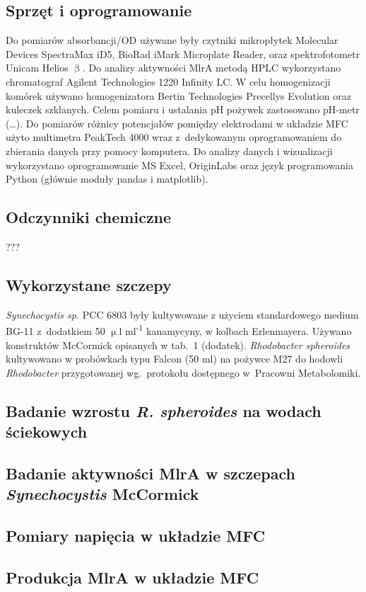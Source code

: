 \subsection{Sprzęt i oprogramowanie}\label{subsec:sprzet}
Do pomiarów absorbancji/OD używane były czytniki mikropłytek
Molecular Devices SpectraMax iD5, BioRad iMark
Microplate Reader, oraz spektrofotometr Unicam Helios $\upbeta$.
Do analizy aktywności MlrA metodą HPLC wykorzystano chromatograf
Agilent Technologies 1220 Infinity LC\@.
W celu homogenizacji komórek używano homogenizatora
Bertin Technologies Precellys Evolution oraz kuleczek szklanych.
Celem pomiaru i ustalania pH pożywek zastosowano pH-metr (\ldots).
Do pomiarów różnicy potencjałów pomiędzy elektrodami
w układzie MFC użyto multimetra PeakTech 4000 wraz
z~dedykowanym oprogramowaniem do zbierania danych
przy pomocy komputera.
Do analizy danych i wizualizacji wykorzystano oprogramowanie
MS Excel, OriginLabs oraz język programowania Python
(głównie moduły pandas i matplotlib).

\subsection{Odczynniki chemiczne}\label{subsec:odczynniki}
???

\subsection{Wykorzystane szczepy}\label{subsec:szczepy}
\textit{Synechocystis sp.} PCC 6803 były kultywowane z użyciem
standardowego medium BG-11 z~dodatkiem 50
$\upmu$l ml\textsuperscript{-1} kanamycyny, w kolbach Erlenmayera.
Używano konstruktów McCormick opisanych w tab.\ 1 (dodatek).
\textit{Rhodobacter spheroides} kultywowano w probówkach typu
Falcon (50 ml) na pożywce M27 do hodowli
\textit{Rhodobacter} przygotowanej wg.\ protokołu
dostępnego w~Pracowni Metabolomiki.

\subsection{Badanie wzrostu \textit{R. spheroides} na wodach ściekowych}\label{subsec:rhodobacter}

\subsection{Badanie aktywności MlrA w szczepach \textit{Synechocystis} McCormick}\label{subsec:mlra}

\subsection{Pomiary napięcia w układzie MFC}\label{subsec:volt}

\subsection{Produkcja MlrA w układzie MFC}\label{subsec:mfc}